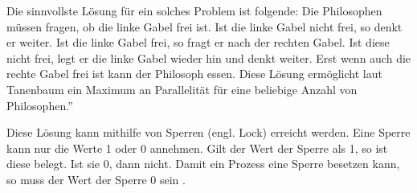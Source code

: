 Die sinnvollste Lösung für ein solches Problem ist folgende: Die Philosophen müssen fragen, ob die linke Gabel frei ist. Ist die linke Gabel nicht frei, so denkt er weiter. Ist die linke Gabel frei, so fragt er nach der rechten Gabel. Ist diese nicht frei, legt er die linke Gabel wieder hin und denkt weiter. Erst wenn auch die rechte Gabel frei ist kann der Philosoph essen. Diese Lösung ermöglicht laut Tanenbaum \glqq ein Maximum an Parallelität für eine beliebige Anzahl von Philosophen.''\parencite[S.222]{tanenbaum2016}

Diese Lösung kann mithilfe von Sperren (engl. Lock) erreicht werden. Eine Sperre kann nur die Werte 1 oder 0 annehmen. Gilt der Wert der Sperre als 1, so ist diese belegt. Ist sie 0, dann nicht. Damit ein Prozess eine Sperre besetzen kann, so muss der Wert der Sperre 0 sein \parencite[vgl.][S.148]{mandl2020}.



















